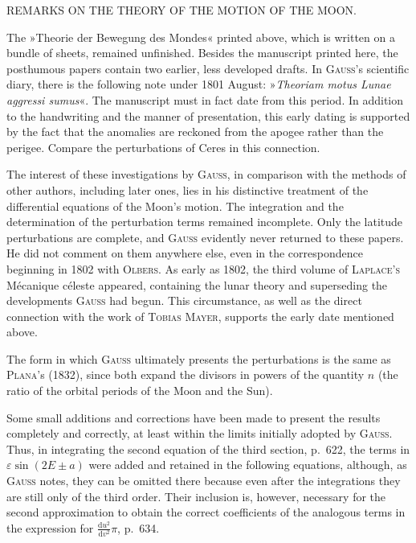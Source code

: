 \clearpage
\begingroup
\fancyhead[L]{}
\renewcommand{\headrulewidth}{0pt}
\begin{center}\large REMARKS ON THE THEORY OF THE MOTION OF THE MOON.\end{center}

\par\noindent\hspace*{\parindent}The »Theorie der Bewegung des Mondes« printed above, which is written on a bundle of
sheets, remained unfinished. Besides the manuscript printed here, the posthumous papers contain two
earlier, less developed drafts. In \textsc{Gauss}’s scientific diary, there is the following note under 1801
August: »\textit{Theoriam motus Lunae aggressi sumus}«. The manuscript must in fact date from this period.
In addition to the handwriting and the manner of presentation, this early dating is supported by the
fact that the anomalies are reckoned from the apogee rather than the perigee. Compare
the perturbations of Ceres in this connection.

\par\noindent\hspace*{\parindent}The interest of these investigations by \textsc{Gauss}, in comparison with the methods of other authors, including
later ones, lies in his distinctive treatment of the differential equations of the Moon’s motion.
The integration and the determination of the perturbation terms remained incomplete.
Only the latitude perturbations are complete, and \textsc{Gauss} evidently never returned to these papers.
He did not comment on them anywhere else, even in the correspondence beginning in 1802
with \textsc{Olbers}. As early as 1802, the third volume of \textsc{Laplace’s}
Mécanique céleste appeared, containing the lunar theory and superseding the developments \textsc{Gauss}
had begun. This circumstance, as well as the direct connection with the work of \textsc{Tobias Mayer}, supports the
early date mentioned above.

\par\noindent\hspace*{\parindent}The form in which \textsc{Gauss} ultimately presents the perturbations is the same as \textsc{Plana}’s
(1832), since both expand the divisors in powers of the quantity \(n\) (the ratio of the orbital periods of the Moon and
the Sun).

\par\noindent\hspace*{\parindent}Some small additions and corrections have been made to present the results completely and correctly, at least
within the limits initially adopted by \textsc{Gauss}. Thus, in integrating
the second equation of the third section, p.~622, the terms in \(\varepsilon\sin(2E\pm a)\) were added and
retained in the following equations, although, as \textsc{Gauss} notes, they can be omitted there
because even after the integrations they are still only of the third order. Their inclusion is, however,
necessary for the second approximation to obtain the correct coefficients of the analogous terms in the expression
for \(\frac{\mathrm du^2}{\mathrm dv^2}\pi\), p.~634.

